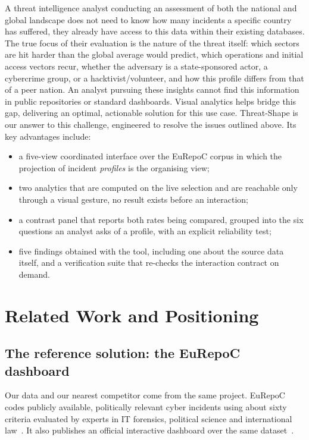 \documentclass[conference]{IEEEtran}
\begin{document}
A threat intelligence analyst conducting an assessment of both the national and global landscape does not need to know how many incidents a specific country has suffered, they already have access to this data within their existing databases. 
\newline
The true focus of their evaluation is the nature of the threat itself: which sectors are hit harder than the global average would predict, which operations and initial access vectors recur, whether the adversary is a state-sponsored actor, a cybercrime group, or a hacktivist/volunteer, and how this profile differs from that of a peer nation. An analyst pursuing these insights cannot find this information in public repositories or standard dashboards. Visual analytics helps bridge this gap, delivering an optimal, actionable solution for this use case. 
\newline
Threat-Shape is our answer to this challenge, engineered to resolve the issues outlined above. Its key advantages include:

\begin{itemize}
\item a five-view coordinated interface over the EuRepoC corpus in which the projection
of incident \emph{profiles} is the organising view;
\item two analytics that are computed on the live selection and are reachable only
through a visual gesture, no result exists before an
interaction;
\item a contrast panel that reports both rates being compared, grouped into the six
questions an analyst asks of a profile, with an explicit reliability test;
\item five findings obtained with the tool, including one about the source data itself,
and a verification suite that re-checks the interaction contract on demand.
\end{itemize}

\section{Related Work and Positioning}

\subsection{The reference solution: the EuRepoC dashboard}

Our data and our nearest competitor come from the same project. EuRepoC codes publicly
available, politically relevant cyber incidents using about sixty criteria evaluated by
experts in IT forensics, political science and international law~\cite{eurepoc-data}. It also publishes an official interactive dashboard over the same dataset~\cite{eurepoc-dash}.
\end{document}
